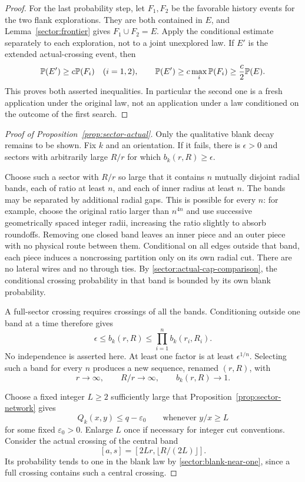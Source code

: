 \begin{proof}
For the last probability step, let $F_1,F_2$ be the favorable history
events for the two flank explorations.  They are both contained in
$E$, and Lemma~\ref{sector:frontier} gives $F_1\cup F_2=E$.
Apply the conditional estimate separately to each exploration, not
to a joint unexplored law.  If $E'$ is the extended actual-crossing
event, then
\[
 \mathbb P(E')\ge c\mathbb P(F_i)\quad(i=1,2),\qquad
 \mathbb P(E')\ge c\max_i\mathbb P(F_i)\ge\frac c2\mathbb P(E).
\]
This proves both asserted inequalities.  In particular the second
one is a fresh application under the original law, not an application
under a law conditioned on the outcome of the first search.
\end{proof}

\begin{proof}[Proof of Proposition~\ref{prop:sector-actual}]
Only the qualitative blank decay remains to be shown.  Fix $k$ and
an orientation.  If it fails, there is $\epsilon>0$ and sectors with
arbitrarily large $R/r$ for which $b_k(r,R)\ge\epsilon$.

Choose such a sector with $R/r$ so large that it contains $n$
mutually disjoint radial bands, each of ratio at least $n$, and
each of inner radius at least $n$.  The bands may be separated by
additional radial gaps.  This is possible for every $n$: for
example, choose the original ratio larger than $n^{4n}$ and use
successive geometrically spaced integer radii, increasing the
ratio slightly to absorb roundoffs.  Removing one closed band
leaves an inner piece and an outer piece with no physical route
between them.  Conditional on all edges outside that band, each
piece induces a noncrossing partition only on its own radial cut.
There are no lateral wires and no through ties.  By
\eqref{sector:actual-cap-comparison}, the conditional crossing
probability in that band is bounded by its own blank probability.

A full-sector crossing requires crossings of all the bands.
Conditioning outside one band at a time therefore gives
\[
 \epsilon\le b_k(r,R)
      \le \prod_{i=1}^n b_k(r_i,R_i).
\]
No independence is asserted here.  At least one factor is at least
$\epsilon^{1/n}$.  Selecting such a band for every $n$ produces a
new sequence, renamed $(r,R)$, with
\begin{equation}
\label{sector:blank-near-one}
 r\longrightarrow\infty,\qquad R/r\longrightarrow\infty,
 \qquad b_k(r,R)\longrightarrow1.
\end{equation}

Choose a fixed integer $L\ge2$ sufficiently large that
Proposition~\ref{prop:sector-network} gives
\begin{equation}
\label{sector:collar-pure-small}
 Q_k(x,y)\le q-\varepsilon_0
 \qquad\text{whenever }y/x\ge L
\end{equation}
for some fixed $\varepsilon_0>0$.  Enlarge $L$ once if necessary
for integer cut conventions.  Consider the actual crossing of the
central band
\[
 [a,s]=[2Lr,\lfloor R/(2L)\rfloor].
\]
Its probability tends to one in the blank law by
\eqref{sector:blank-near-one}, since a full crossing contains such
a central crossing.


\end{proof}
